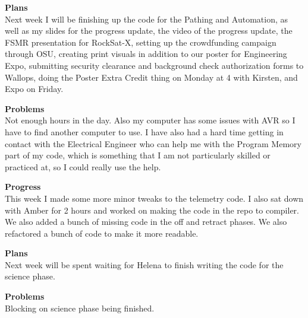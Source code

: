 \textbf{Plans} \\ 
Next week I will be finishing up the code for the Pathing and Automation, as well as my slides for the progress update, the video of the progress update, the FSMR presentation for RockSat-X, setting up the crowdfunding campaign through OSU, creating print visuals in addition to our poster for Engineering Expo, submitting security clearance and background check authorization forms to Wallops, doing the Poster Extra Credit thing on Monday at 4 with Kirsten, and Expo on Friday.

\textbf{Problems} \\ 
Not enough hours in the day. Also my computer has some issues with AVR so I have to find another computer to use. I have also had a hard time getting in contact with the Electrical Engineer who can help me with the Program Memory part of my code, which is something that I am not particularly skilled or practiced at, so I could really use the help.

\textbf{Progress} \\
This week I made some more minor tweaks to the telemetry code. I also sat down with Amber for 2 hours and worked on making the code in the repo to compiler. We also added a bunch of missing code in the off and retract phases. We also refactored a bunch of code to make it more readable.

\textbf{Plans} \\
Next week will be spent waiting for Helena to finish writing the code for the science phase.

\textbf{Problems} \\
Blocking on science phase being finished.


